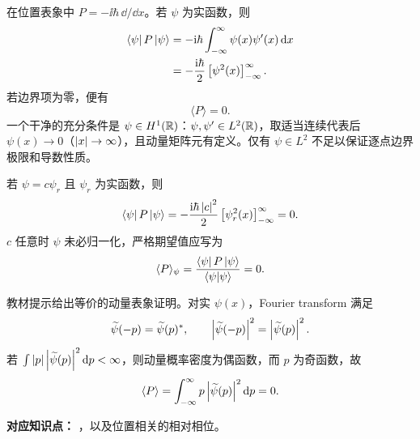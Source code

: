 \begin{checkedsolution}
在位置表象中 $P=-\ii\hbar\,\dd/\dd x$。若 $\psi$ 为实函数，则
\begin{align}
  \left\langle \psi\right|P\left|\psi\right\rangle
  &=-\mathrm{i}\hbar
    \int_{-\infty}^{\infty}\psi(x)\psi'(x)\mathop{}\!\mathrm{d} x
  \notag\\
  &=-\frac{\mathrm{i}\hbar}{2}
    \left[\psi^2(x)\right]_{-\infty}^{\infty}.
  \label{eq:QM-C04-S02-E01-position-proof}
\end{align}
若边界项为零，便有
\begin{equation}
  \boxed{\langle P\rangle=0}.
  \label{eq:QM-C04-S02-E01-zero-mean-momentum}
\end{equation}
一个干净的充分条件是 $\psi\in H^1(\mathbb{R})$：$\psi,\psi'\in L^2(\mathbb{R})$，取适当连续代表后 $\psi(x)\to0$（$\left|x\right|\to\infty$），且动量矩阵元有定义。仅有 $\psi\in L^2$ 不足以保证逐点边界极限和导数性质。

若 $\psi=c\psi_r$ 且 $\psi_r$ 为实函数，则
\begin{equation}
  \left\langle \psi\right|P\left|\psi\right\rangle
  =-\frac{\mathrm{i}\hbar\left|c\right|^2}{2}
   \left[\psi_r^2(x)\right]_{-\infty}^{\infty}=0.
  \label{eq:QM-C04-S02-E01-complex-constant}
\end{equation}
$c$ 任意时 $\psi$ 未必归一化，严格期望值应写为
\begin{equation}
  \langle P\rangle_\psi
  =\frac{\left\langle \psi\right|P\left|\psi\right\rangle}{\left\langle \psi \middle| \psi \right\rangle}=0.
  \label{eq:QM-C04-S02-E01-unnormalized-expectation}
\end{equation}

教材提示给出等价的动量表象证明。对实 $\psi(x)$，Fourier transform 满足
\begin{equation}
  \widetilde\psi(-p)=\widetilde\psi(p)^*,
  \qquad
  \left|\widetilde\psi(-p)\right|^2
  =\left|\widetilde\psi(p)\right|^2.
  \label{eq:QM-C04-S02-E01-fourier-symmetry}
\end{equation}
若 $\int\left|p\right|\left|\widetilde\psi(p)\right|^2\mathop{}\!\mathrm{d} p<\infty$，则动量概率密度为偶函数，而 $p$ 为奇函数，故
\begin{equation}
  \langle P\rangle
  =\int_{-\infty}^{\infty}
    p\left|\widetilde\psi(p)\right|^2\mathop{}\!\mathrm{d} p=0.
  \label{eq:QM-C04-S02-E01-momentum-proof}
\end{equation}
\end{checkedsolution}


\textbf{对应知识点：}
，以及位置相关的相对相位。

